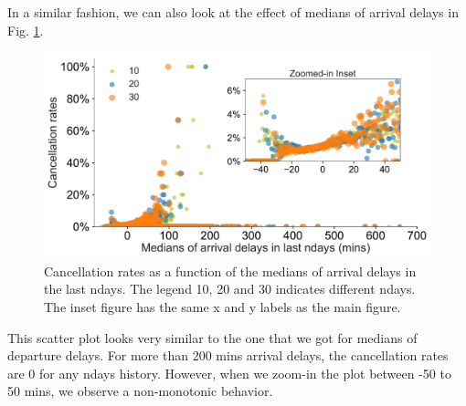 \documentclass[12pt]{article}
\begin{document}
In a similar fashion, we can also look at the effect of medians of arrival delays in Fig. \ref{fig:arrdelaymediancanrate}.
\begin{figure}[h!]
\begin{center}
\includegraphics[width=6in]{arrdelaymedian_canrate.pdf}
\end{center}
\caption{\label{fig:arrdelaymediancanrate}
Cancellation rates as a function of the medians of arrival delays in the last ndays. The legend 10, 20 and 30 indicates different ndays. The inset figure has the same x and y labels as the main figure.}
\end{figure}
This scatter plot looks very similar to the one that we got for medians of departure delays. For more than 200 mins arrival delays, the cancellation rates are 0 for any ndays history. However, when we zoom-in the plot between -50 to 50 mins, we observe a non-monotonic behavior.   
\end{document}
